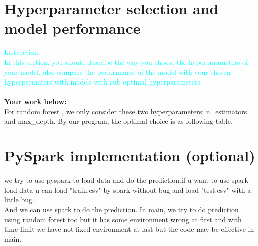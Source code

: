\documentclass{article}
\begin{document}
\section{Hyperparameter selection and model performance}
\textcolor{cyan}{Instruction: \\
In this section, you should describe the way you choose the hyperparameters of your model, also compare the performance of the model with your chosen hyperparamters with models with sub-optimal hyperparameters}\\\\
\textbf{Your work below:}\\
For random forest , we only consider these two hyperparameters:
n\_estimators and max\_depth. By our program, the optimal choice is as following table.\\
\section{PySpark implementation (optional)}
we try to use pyspark to load data and do the prediction.if u want to use spark load data u can load "train.csv" by spark without bug and load "test.csv" with a little bug.\\
And we can use spark to do the prediction. In main, we try to do prediction using random forest too but it has some environment wrong at first and with time limit we have not fixed environment at last but the code may be effective in main.\\
\end{document}
